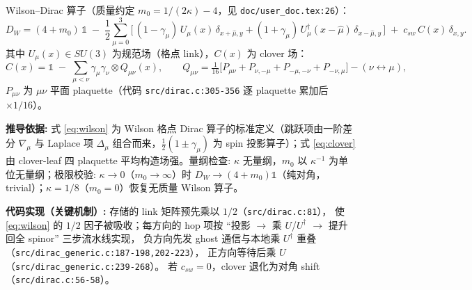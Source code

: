 \documentclass[UTF8]{ctexart}
\begin{document}
Wilson--Dirac 算子（质量约定 $m_0=1/(2\kappa)-4$，见 \texttt{\nolinkurl{doc/user_doc.tex:26}}）：
\begin{equation}\label{eq:wilson}
D_W = (4+m_0)\,\mathbb{1} \;-\; \frac{1}{2}\sum_{\mu=0}^{3}
\Big[\, (1-\gamma_\mu)\, U_\mu(x)\,\delta_{x+\hat\mu,y}
+ (1+\gamma_\mu)\, U_\mu^\dagger(x-\hat\mu)\,\delta_{x-\hat\mu,y}\,\Big] \;+\; c_{sw}\, C(x)\,\delta_{x,y} .
\end{equation}
其中 $U_\mu(x)\in SU(3)$ 为规范场（格点 link），$C(x)$ 为 clover 场：
\begin{equation}\label{eq:clover}
C(x) = \mathbb{1} \;-\; \sum_{\mu<\nu} \gamma_\mu\gamma_\nu \otimes Q_{\mu\nu}(x),\qquad
Q_{\mu\nu} = \tfrac{1}{16}\Big[ P_{\mu\nu}+P_{\nu,-\mu}+P_{-\mu,-\nu}+P_{-\nu,\mu} \Big] - (\nu\leftrightarrow\mu),
\end{equation}
$P_{\mu\nu}$ 为 $\mu\nu$ 平面 plaquette（代码 \texttt{\nolinkurl{src/dirac.c:305-356}} 逐 plaquette 累加后 $\times 1/16$）。

\textbf{推导依据:} 式 \eqref{eq:wilson} 为 Wilson 格点 Dirac 算子的标准定义（跳跃项由一阶差分 $\nabla_\mu$ 与 Laplace 项 $\Delta_\mu$ 组合而来，$\frac12(1\pm\gamma_\mu)$ 为 spin 投影算子）；式 \eqref{eq:clover} 由 clover-leaf 四 plaquette 平均构造场强。\textcolor{phys}{量纲检查:} $\kappa$ 无量纲，$m_0$ 以 $\kappa^{-1}$ 为单位无量纲；\textcolor{phys}{极限校验:} $\kappa\to 0$（$m_0\to\infty$）时 $D_W\to (4+m_0)\mathbb{1}$（纯对角，trivial）；$\kappa=1/8$（$m_0=0$）恢复无质量 Wilson 算子。

\textbf{代码实现（关键机制）:} 存储的 link 矩阵预先乘以 $1/2$（\texttt{\nolinkurl{src/dirac.c:81}}），
使 \eqref{eq:wilson} 的 $1/2$ 因子被吸收；每方向的 hop 项按 ``投影 $\to$ 乘 $U$/$U^\dagger$ $\to$ 提升回全 spinor'' 三步流水线实现，
负方向先发 ghost 通信与本地乘 $U^\dagger$ 重叠（\texttt{\nolinkurl{src/dirac_generic.c:187-198,202-223}}），
正方向等待后乘 $U$（\texttt{\nolinkurl{src/dirac_generic.c:239-268}}）。
若 $c_{sw}=0$，clover 退化为对角 shift（\texttt{\nolinkurl{src/dirac.c:56-58}}）。
\end{document}

